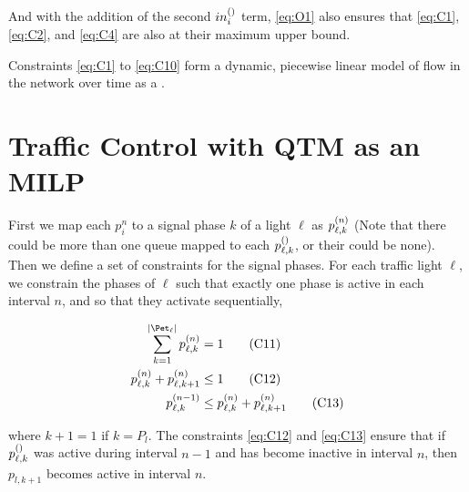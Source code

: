 And with the addition of the second $\inq[]{i}$ term, \ref{eq:O1} also ensures
that \ref{eq:C1}, \ref{eq:C2}, and \ref{eq:C4} are also at their maximum upper
bound.



Constraints \ref{eq:C1} to \ref{eq:C10} form a dynamic, piecewise linear model
of flow in the network over time as a .




\section{Traffic Control with QTM as an MILP}






First we map each $p_i^n$ to a signal phase $k$ of a light $\ell$ as
$\p{\ell}{k}$ (Note that there could be more than one queue mapped to each
$\p[]{\ell}{k}$, or their could be none). Then we define a set of constraints
for the signal phases. For each traffic light $\ell$, we constrain the phases of
$\ell$ such that exactly one phase is active in each interval $n$, and so that
they activate sequentially,

\begin{align}
\sum\limits_{k=1}^{\Pn} \p{\ell}{k} &= 1\tag{C11}\label{eq:C11}\\
\p{\ell}{k} + \p{\ell}{k+1} &\le 1\tag{C12}\label{eq:C12}\\
\p[n-1]{\ell}{k} &\le \p{\ell}{k} + \p{\ell}{k+1}\tag{C13}\label{eq:C13}
\end{align}

where $k+1=1$ if $k=P_l$. The constraints \ref{eq:C12} and \ref{eq:C13} ensure
that if $\p[]{\ell}{k}$ was active during interval $n-1$ and has become inactive
in interval $n$, then $p_{l,k+1}$ becomes active in interval $n$.

